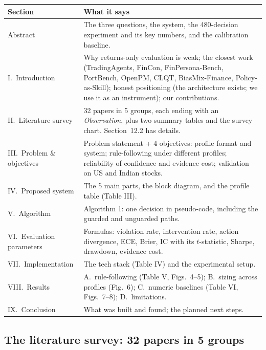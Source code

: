 \documentclass[10.5pt,a4paper]{article}
\begin{document}
\begin{tabularx}{\linewidth}{L{3.4cm}Y}
\toprule
\textbf{Section} & \textbf{What it says} \\
\midrule
Abstract & The three questions, the system, the 480-decision experiment and its key numbers, and the calibration baseline. \\
I.\ Introduction & Why returns-only evaluation is weak; the closest work (TradingAgents, FinCon, FinPersona-Bench, PortBench, OpenPM, CLQT, BiasMix-Finance, Policy-as-Skill); honest positioning (the architecture exists; we use it as an instrument); our contributions. \\
II.\ Literature survey & 32 papers in 5 groups, each ending with an \emph{Observation}, plus two summary tables and the survey chart. Section~12.2 has details. \\
III.\ Problem \& objectives & Problem statement + 4 objectives: profile format and system; rule-following under different profiles; reliability of confidence and evidence cost; validation on US and Indian stocks. \\
IV.\ Proposed system & The 5 main parts, the block diagram, and the profile table (Table III). \\
V.\ Algorithm & Algorithm 1: one decision in pseudo-code, including the guarded and unguarded paths. \\
VI.\ Evaluation parameters & Formulas: violation rate, intervention rate, action divergence, ECE, Brier, IC with its $t$-statistic, Sharpe, drawdown, evidence cost. \\
VII.\ Implementation & The tech stack (Table IV) and the experimental setup. \\
VIII.\ Results & A.\ rule-following (Table V, Figs.\ 4--5); B.\ sizing across profiles (Fig.\ 6); C.\ numeric baselines (Table VI, Figs.\ 7--8); D.\ limitations. \\
IX.\ Conclusion & What was built and found; the planned next steps. \\
\bottomrule
\end{tabularx}

\subsection{The literature survey: 32 papers in 5 groups}
\end{document}
